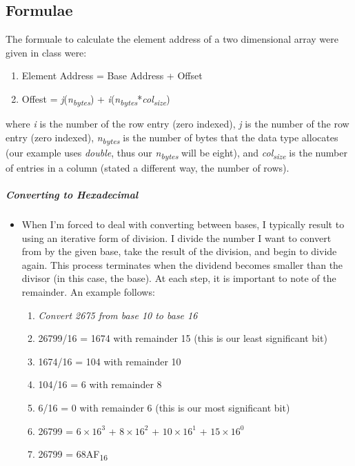\documentclass[12pt]{article}
\begin{document}
\subsection{Formulae}
The formuale to calculate the element address of a two dimensional array were given in class were:
\begin{enumerate}
\item Element Address = Base Address + Offset
\item Offest = \textit{j}(\textit{n\textsubscript{bytes}}) + \textit{i}(\textit{n\textsubscript{bytes}}*\textit{col\textsubscript{size}})
\end{enumerate}
where \textit{i} is the number of the row entry (zero indexed), \textit{j} is the number of the row entry (zero indexed), \textit{n\textsubscript{bytes}} is the number of bytes that the data type allocates (our example uses \textit{double}, thus our \textit{n\textsubscript{bytes}} will be eight), and \textit{col\textsubscript{size}} is the number of entries in a column (stated a different way, the number of rows).
\subparagraph{Converting to Hexadecimal}
\begin{itemize}[leftmargin=1.5em]
\item[] When I'm forced to deal with converting between bases, I typically result to using an iterative form of division. I divide the number I want to convert from by the given base, take the result of the division, and begin to divide again. This process terminates when the dividend becomes smaller than the divisor (in this case, the base). At each step, it is important to note of the remainder. An example follows:
\begin{enumerate}
\item[] \textit{Convert 2675 from base 10 to base 16}
\item 26799/16 = 1674 with remainder 15 (this is our least significant bit)
\item 1674/16 = 104 with remainder 10
\item 104/16 = 6 with remainder 8
\item 6/16 = 0 with remainder 6 (this is our most significant bit)
\item 26799 = $6\times16^3$ + $8\times16^2$ + $10\times16^1$ + $15\times16^0$
\item 26799 = 68AF\textsubscript{16}
\end{enumerate}
\end{itemize}



\newpage %
\end{document}
